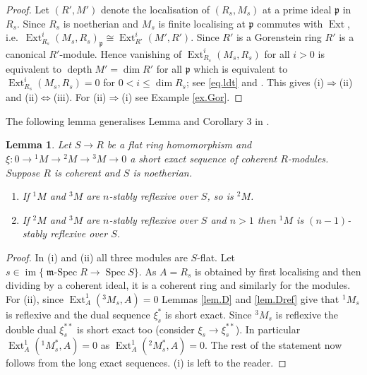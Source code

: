 \documentclass[a4paper,10pt]{amsart}
\theoremstyle{plain}
\newtheorem{lem}[xx]{Lemma}%
\theoremstyle{definition}
\theoremstyle{remark}
\numberwithin{equation}{xx}
\DeclareMathOperator{\depth}{depth}
\DeclareMathOperator{\Ext}{Ext}
\DeclareMathOperator{\im}{im}
\DeclareMathOperator{\mSpec}{\fr{m}-Spec}
\DeclareMathOperator{\Spec}{Spec}
\newcommand{\co}{\colon}
\newcommand{\ra}{\rightarrow}
\newcommand{\lRa}{\Leftrightarrow}
\newcommand{\Ra}{\Rightarrow}
\renewcommand{\leq}{\leqslant}
\newcommand{\fr}[1]{\mathfrak{{#1}}}
\newcommand{\xt}[4]{{\Ext} _{#2}^{#1}({#3},{#4})}
\begin{document}
\begin{proof}
Let \((R',M')\) denote the localisation of \((R_{s},M_{s})\) at a prime ideal \(\fr{p}\) in \(R_{s}\). Since \(R_{s}\) is noetherian and \(M_{s}\) is finite localising at \(\fr{p}\) commutes with \(\Ext\), i.e.\ \(\xt{i}{R_{s}}{M_{s}}{R_{s}}_{\fr{p}}\cong\xt{i}{R'}{M'}{R'}\). Since \(R'\) is a Gorenstein ring \(R'\) is a canonical \(R'\)-module. Hence vanishing of \(\xt{i}{R_{s}}{M_{s}}{R_{s}}\) for all \(i>0\) is equivalent to \(\depth M'=\dim R'\) for all \(\fr{p}\) which is equivalent to \(\xt{i}{R_{s}}{M_{s}}{R_{s}}=0\) for \(0<i\leq \dim R_{s}\); see \eqref{eq.ldt} and \cite[3.5.11]{bru/her:98}. This gives (i)\(\Ra\)(ii) and (ii)\(\lRa\)(iii). For (ii)\(\Ra\)(i) see Example \ref{ex.Gor}.
\end{proof}
The following lemma generalises Lemma and Corollary 3 in \cite[Appendix]{knu:83a}.
\begin{lem}\label{lem.nstabex2}
Let \(S\ra R\) be a flat ring homomorphism and \(\xi\co 0\ra{}^{1\!}M\ra {}^{2\!}M\ra {}^{3\!}M\ra 0\) a short exact sequence of coherent \(R\)-modules\textup{.} Suppose \(R\) is coherent and \(S\) is noetherian\textup{.}
\begin{enumerate}
\item[(i)] If \({}^{1\!}M\) and \({}^{3\!}M\) are \(n\)-stably reflexive over \(S\)\textup{,} so is \({}^{2\!}M\)\textup{.}
\item[(ii)] If \({}^{2\!}M\) and \({}^{3\!}M\) are \(n\)-stably reflexive over \(S\) and \(n>1\) then \({}^{1\!}M\) is \((n{-}1)\)-stably reflexive over \(S\)\textup{.}
\end{enumerate}
\end{lem}
\begin{proof}
In (i) and (ii) all three modules are \(S\)-flat. Let \(s\in\im\{\mSpec R\ra\Spec S\}\)\textup{.} As \(A=R_{s}\) is obtained by first localising and then dividing by a coherent ideal, it is a coherent ring and similarly for the modules. For (ii), since \(\xt{1}{A}{{}^{3\!}M_{s}}{A}=0\) Lemmas \ref{lem.D} and \ref{lem.Dref} give that \({}^{1\!}M_{s}\) is reflexive and the dual sequence \(\xi_{s}^{*}\) is short exact. Since \({}^{3\!}M_{s}\) is reflexive the double dual \(\xi_{s}^{**}\) is short exact too (consider \(\xi_{s}\ra\xi_{s}^{**}\)). In particular \(\xt{1}{A}{{}^{1\!}M_{s}^{*}}{A}=0\) as \(\xt{1}{A}{{}^{2\!}M_{s}^{*}}{A}=0\). The rest of the statement now follows from the long exact sequences. (i) is left to the reader.
\end{proof}
\end{document}
